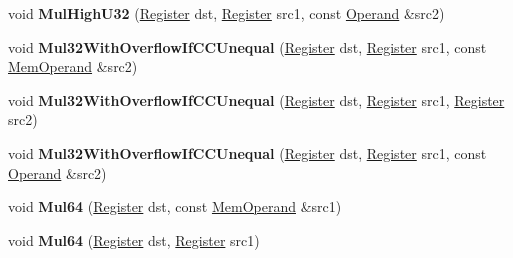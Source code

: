 \begin{DoxyCompactItemize}
\item 
\mbox{\label{classv8_1_1internal_1_1TurboAssembler_a37df101b0f49ddd3de6a083264426baa}} 
void {\bfseries Mul\+High\+U32} (\mbox{\hyperlink{classv8_1_1internal_1_1Register}{Register}} dst, \mbox{\hyperlink{classv8_1_1internal_1_1Register}{Register}} src1, const \mbox{\hyperlink{classv8_1_1internal_1_1Operand}{Operand}} \&src2)
\item 
\mbox{\label{classv8_1_1internal_1_1TurboAssembler_aa24b29463a743e25b538ef07cf5b884d}} 
void {\bfseries Mul32\+With\+Overflow\+If\+C\+C\+Unequal} (\mbox{\hyperlink{classv8_1_1internal_1_1Register}{Register}} dst, \mbox{\hyperlink{classv8_1_1internal_1_1Register}{Register}} src1, const \mbox{\hyperlink{classv8_1_1internal_1_1MemOperand}{Mem\+Operand}} \&src2)
\item 
\mbox{\label{classv8_1_1internal_1_1TurboAssembler_a6e10a31f0c39d6f840d63997e1829c26}} 
void {\bfseries Mul32\+With\+Overflow\+If\+C\+C\+Unequal} (\mbox{\hyperlink{classv8_1_1internal_1_1Register}{Register}} dst, \mbox{\hyperlink{classv8_1_1internal_1_1Register}{Register}} src1, \mbox{\hyperlink{classv8_1_1internal_1_1Register}{Register}} src2)
\item 
\mbox{\label{classv8_1_1internal_1_1TurboAssembler_acfd7bb6b57bb46e269b4ef562f971d9f}} 
void {\bfseries Mul32\+With\+Overflow\+If\+C\+C\+Unequal} (\mbox{\hyperlink{classv8_1_1internal_1_1Register}{Register}} dst, \mbox{\hyperlink{classv8_1_1internal_1_1Register}{Register}} src1, const \mbox{\hyperlink{classv8_1_1internal_1_1Operand}{Operand}} \&src2)
\item 
\mbox{\label{classv8_1_1internal_1_1TurboAssembler_ab731606804d8cd9a868cf79e82cf0c29}} 
void {\bfseries Mul64} (\mbox{\hyperlink{classv8_1_1internal_1_1Register}{Register}} dst, const \mbox{\hyperlink{classv8_1_1internal_1_1MemOperand}{Mem\+Operand}} \&src1)
\item 
\mbox{\label{classv8_1_1internal_1_1TurboAssembler_a3ec5d1a110d8a47d91be5960dc052559}} 
void {\bfseries Mul64} (\mbox{\hyperlink{classv8_1_1internal_1_1Register}{Register}} dst, \mbox{\hyperlink{classv8_1_1internal_1_1Register}{Register}} src1)

\end{DoxyCompactItemize}
